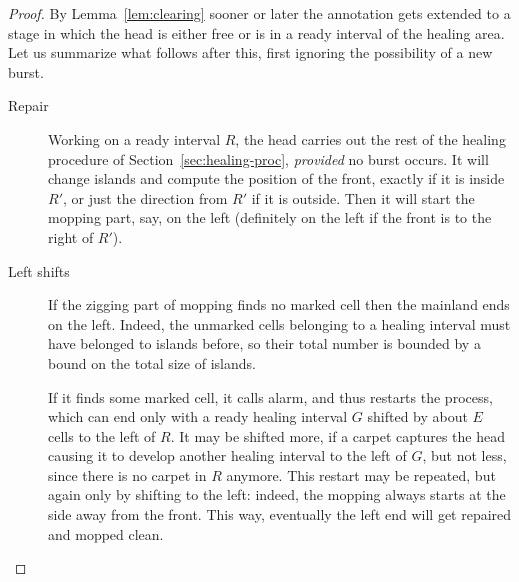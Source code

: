 \documentclass[12pt]{memoir}
\newcommand{\authnote}[3]
{\text{{ \textcolor{#3}{\( \langle\hspace{-0.2em}\langle \)\textsf{\footnotesize #1: #2}\( \rangle\hspace{-0.2em}\rangle \)}}}}
\newcommand{\authnote}[2]{}
\newcommand{\Pnote}[1]{{\authnote{P}{#1}{cyan}}}
\newcommand{\E}{E}
\renewcommand{\H}{H}
\begin{document}
\begin{proof}


By Lemma~\ref{lem:clearing} sooner or later the annotation gets extended
to a stage in which the head is either free or is in a ready interval of the healing area.
Let us summarize what follows after this, first ignoring the possibility of a new burst.
\begin{description}
\item[Repair] 
Working on a ready interval \( R \), the head carries out
the rest of the healing procedure of Section~\ref{sec:healing-proc}, 
\emph{provided} no burst occurs.
It will change islands and compute the position of the front, exactly
if it is inside \( R' \), or just the direction from \( R' \) if it is outside.
Then it will start the mopping part, say, on the left (definitely on the left if
the front is to the right of \( R' \)).

\item[Left shifts] If the zigging part of mopping finds no marked cell
then the mainland ends on the left.
Indeed, the unmarked cells belonging to a healing interval must have belonged
to islands before, so their total number is bounded by a bound on the total size
of islands.

If it finds some marked cell, it calls alarm, and thus restarts
the process, which can end only with a ready
healing interval \( G \) shifted by about \( \E \) cells to the left of \( R \).
It may be shifted more, if a carpet captures the head causing it to develop
another healing interval to the left of \( G \),
but not less, since there is no carpet in \( R \) anymore.
This restart may be repeated, but again only by shifting to the left:
indeed, the mopping always starts at the side away from the front.
This way, eventually the left end will get repaired and mopped clean.


\end{description}
\end{proof}
\end{document}
